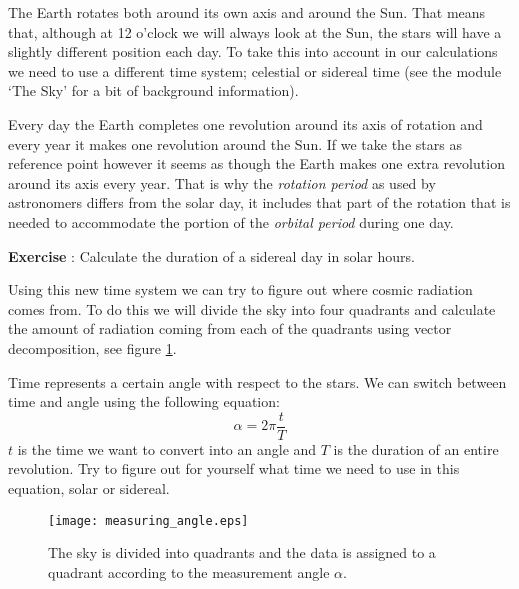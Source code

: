 The Earth rotates both around its own axis and around the Sun. That means that, although at 12 o'clock we will always look at the Sun, the stars will have a slightly different position each day. To take this into account in our calculations we need to use a different time system; celestial or sidereal time (see the module `The Sky' for a bit of background information). 

Every day the Earth completes one revolution around its axis of rotation and every year it makes one revolution around the Sun. If we take the stars as reference point however it seems as though the Earth makes one extra revolution around its axis every year. That is why the \textit{rotation period} as used by astronomers differs from the solar day, it includes that part of the rotation that is needed to accommodate the portion of the \textit{orbital period} during one day.

\begin{shaded}
\textbf{Exercise \theExercise {}} : Calculate the duration of a sidereal day in solar hours.\end{shaded}

Using this new time system we can try to figure out where cosmic radiation comes from. To do this we will divide the sky into four quadrants and calculate the amount of radiation coming from each of the quadrants using vector decomposition, see figure \ref{fig:measuring_angle}.

Time represents a certain angle with respect to the stars. We can switch between time and angle using the following equation:
\begin{equation} \alpha = 2 \pi \frac{t}{T} \label{eq:time} \end{equation}
$t$ is the time we want to convert into an angle and $T$ is the duration of an entire revolution. Try to figure out for yourself what time we need to use in this equation, solar or sidereal.

\begin{figure}\begin{center}
\texttt{[image: measuring\_angle.eps]}
\caption{The sky is divided into quadrants and the data is assigned to a quadrant according to the measurement angle $\alpha$.}\label{fig:measuring_angle}
\end{center}\end{figure}

